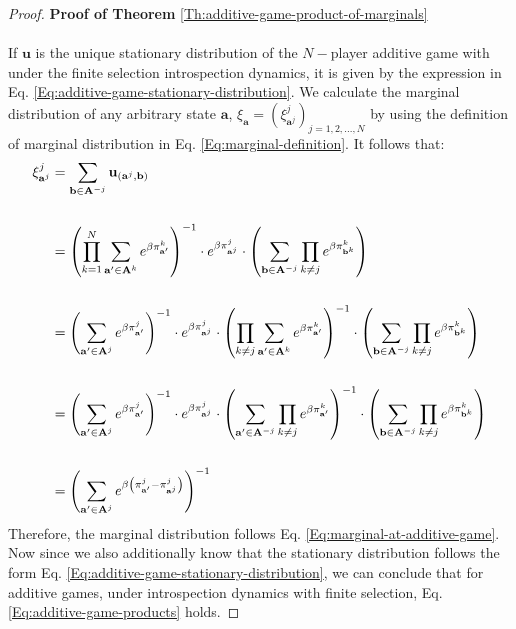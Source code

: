 \documentclass[11pt]{article}
\theoremstyle{plainCl1}
\theoremstyle{plainCl2}
\newcommand{\A}{\mathbf{A}}
\newcommand{\abf}{\mathbf{a}}
\newcommand{\ubf}{\mathbf{u}}
\begin{document}
\begin{proof}
\textbf{Proof of Theorem} \ref{Th:additive-game-product-of-marginals} \\ \\ 
If $\ubf$ is the unique stationary distribution of the $N-$player additive game with under the finite selection introspection dynamics, it is given by the expression in Eq. \ref{Eq:additive-game-stationary-distribution}. We calculate the marginal distribution of any arbitrary state $\abf$, $\xi_{\abf} = (\xi^j_{\abf^j})_{j = 1,2,...,N}$ by using the definition of marginal distribution in Eq. \ref{Eq:marginal-definition}. It follows that: 
\begin{align}
\xi^j_{\abf^j} &= \sum_{\mathbf{b} \in \A^{-j}} \ubf_{(\abf^j,\mathbf{b})} \\ \notag \\
&= \left( \prod_{k=1}^N \sum_{\abf' \in \A^k} \displaystyle e^{\beta \pi^k_{\abf'}}\right)^{-1} \cdot \displaystyle e^{\beta \pi^j_{\abf^j}} \cdot \left( \sum_{\mathbf{b} \in \A^{-j}} \prod_{k \neq j} e^{\beta \pi^k_{\mathbf{b}^k}} \right) \\ \notag \\
&= \left( \sum_{\abf' \in \A^j} \displaystyle e^{\beta \pi^j_{\abf'}}\right)^{-1} \cdot \displaystyle e^{\beta \pi^j_{\abf^j}} \cdot \left( \prod_{k\neq j} \sum_{\abf' \in \A^k} \displaystyle e^{\beta \pi^k_{\abf'}}\right)^{-1} \cdot \left( \sum_{\mathbf{b} \in \A^{-j}} \prod_{k \neq j} e^{\beta \pi^k_{\mathbf{b}^k}} \right) \\ \notag \\ 
&= \left( \sum_{\abf' \in \A^j} \displaystyle e^{\beta \pi^j_{\abf'}}\right)^{-1} \cdot \displaystyle e^{\beta \pi^j_{\abf^j}} \cdot \left( \sum_{\abf' \in \A^{-j}} \prod_{k\neq j}  \displaystyle e^{\beta \pi^k_{\abf'}}\right)^{-1} \cdot \left( \sum_{\mathbf{b} \in \A^{-j}} \prod_{k \neq j} e^{\beta \pi^k_{\mathbf{b}^k}} \right) \\ \notag \\ 
&= \left( \sum_{\abf' \in \A^j} \displaystyle e^{\beta \left( \pi^j_{\abf'} - \pi^j_{\abf^j}\right)}\right)^{-1}
\end{align}
\noindent Therefore, the marginal distribution follows Eq.  \ref{Eq:marginal-at-additive-game}. Now since we also additionally know that the stationary distribution follows the form Eq. \ref{Eq:additive-game-stationary-distribution}, we can conclude that for additive games, under introspection dynamics with finite selection, Eq. \ref{Eq:additive-game-products} holds. 
\end{proof}
\end{document}
